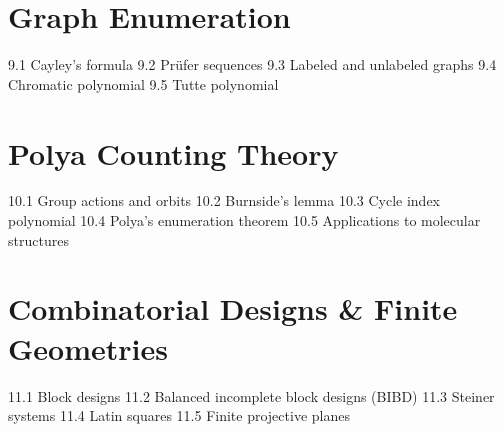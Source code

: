 \section{Graph Enumeration}
9.1 Cayley's formula
9.2 Prüfer sequences
9.3 Labeled and unlabeled graphs
9.4 Chromatic polynomial
9.5 Tutte polynomial
\section{Polya Counting Theory}
10.1 Group actions and orbits
10.2 Burnside's lemma
10.3 Cycle index polynomial
10.4 Polya's enumeration theorem
10.5 Applications to molecular structures
\section{Combinatorial Designs \& Finite Geometries}
11.1 Block designs
11.2 Balanced incomplete block designs (BIBD)
11.3 Steiner systems
11.4 Latin squares
11.5 Finite projective planes
